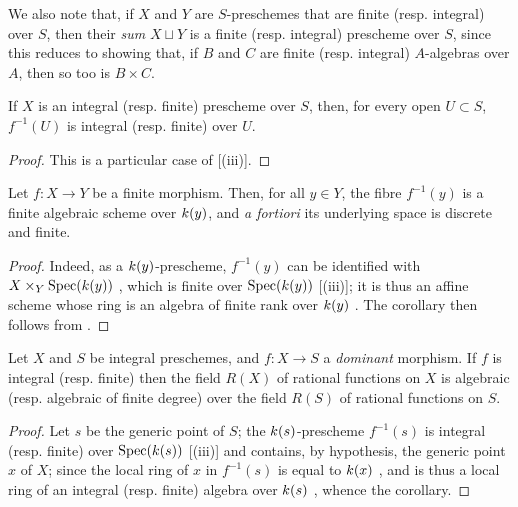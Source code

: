 We also note that, if $X$ and $Y$ are $S$-preschemes that are finite (resp. integral) over $S$, then their \emph{sum} $X\sqcup Y$ is a finite (resp. integral) prescheme over $S$, since this reduces to showing that, if $B$ and $C$ are finite (resp. integral) $A$-algebras over $A$, then so too is $B\times C$.

\begin{corollary}[6.1.6]
\label{II.6.1.6}
If $X$ is an integral (resp. finite) prescheme over $S$, then, for every open $U\subset S$, $f^{-1}(U)$ is integral (resp. finite) over $U$.
\end{corollary}

\begin{proof}
This is a particular case of [(iii)].
\end{proof}

\begin{corollary}[6.1.7]
\label{II.6.1.7}
Let $f:X\to Y$ be a finite morphism.
Then, for all $y\in Y$, the fibre $f^{-1}(y)$ is a finite algebraic scheme over $k(y)$, and \emph{a fortiori} its underlying space is discrete and finite.
\end{corollary}

\begin{proof}
Indeed, as a $k(y)$-prescheme, $f^{-1}(y)$ can be identified with $X\times_Y\operatorname{Spec}(k(y))$ , which is finite over $\operatorname{Spec}(k(y))$ [(iii)];
it is thus an affine scheme whose ring is an algebra of finite rank over $k(y)$ .
The corollary then follows from .
\end{proof}

\begin{corollary}[6.1.8]
\label{II.6.1.8}
Let $X$ and $S$ be integral preschemes, and $f:X\to S$ a \emph{dominant} morphism.
If $f$ is integral (resp. finite) then the field $R(X)$ of rational functions on $X$ is algebraic (resp. algebraic of finite degree) over the field $R(S)$ of rational functions on $S$.
\end{corollary}

\begin{proof}
Let $s$ be the generic point of $S$;
the $k(s)$-prescheme $f^{-1}(s)$ is integral (resp. finite) over $\operatorname{Spec}(k(s))$ [(iii)] and contains, by hypothesis, the generic point $x$ of $X$;
since the local ring of $x$ in $f^{-1}(s)$ is equal to $k(x)$ , and is thus a local ring of an integral (resp. finite) algebra over $k(s)$ , whence the corollary.
\end{proof}

